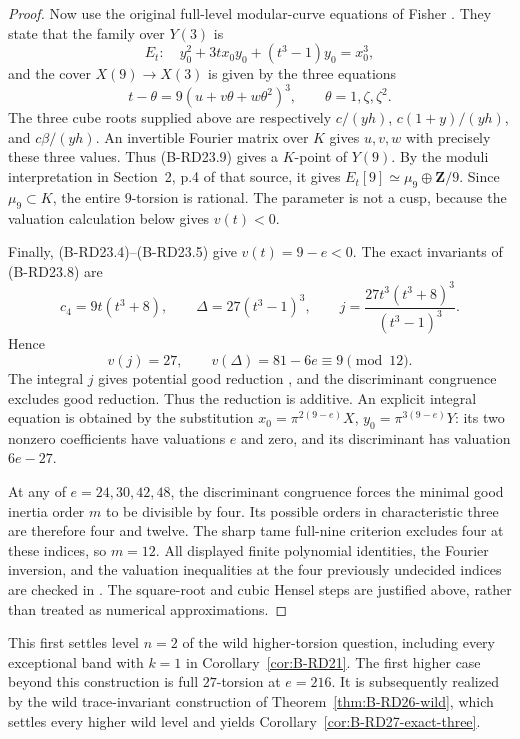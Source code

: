 \begin{proof}
Now use the original full-level modular-curve equations of
Fisher \cite[Lemma~4.2(i), p.8; Theorem~4.3, equation~(9), p.9]
{Fisher2015Nine}. They state that the family over $Y(3)$ is
\[
             E_t:\quad y_0^2+3tx_0y_0+(t^3-1)y_0=x_0^3,
                                                        \tag{B-RD23.8}
\]
and the cover $X(9)\to X(3)$ is given by the three equations
\[
     t-\theta=9(u+v\theta+w\theta^2)^3,
                     \qquad \theta=1,\zeta,\zeta^2.    \tag{B-RD23.9}
\]
The three cube roots supplied above are respectively
$c/(yh)$, $c(1+y)/(yh)$, and $c\beta/(yh)$. An invertible Fourier
matrix over $K$ gives $u,v,w$ with precisely these three values.
Thus (B-RD23.9) gives a $K$-point of $Y(9)$. By the moduli
interpretation in Section~2, p.4 of that source, it gives
$E_t[9]\simeq\mu_9\oplus\mathbf Z/9$. Since $\mu_9\subset K$,
the entire $9$-torsion is rational. The parameter is not a cusp,
because the valuation calculation below gives $v(t)<0$.

Finally, (B-RD23.4)--(B-RD23.5) give $v(t)=9-e<0$. The exact
invariants of (B-RD23.8) are
\[
 c_4=9t(t^3+8),\qquad \Delta=27(t^3-1)^3,\qquad
 j=\frac{27t^3(t^3+8)^3}{(t^3-1)^3}.
\]
Hence
\[
                   v(j)=27,\qquad v(\Delta)=81-6e
                                             \equiv9\pmod {12}.
\]
The integral $j$ gives potential good reduction
\cite[Section~2, p.496]{SerreTate1968Good}, and the discriminant
congruence excludes good reduction. Thus the reduction is additive.
An explicit integral equation is obtained by the substitution
$x_0=\pi^{2(9-e)}X$, $y_0=\pi^{3(9-e)}Y$: its two nonzero
coefficients have valuations $e$ and zero, and its discriminant
has valuation $6e-27$.

At any of $e=24,30,42,48$, the discriminant congruence forces the
minimal good inertia order $m$ to be divisible by four. Its possible
orders in characteristic three are therefore four and twelve.
The sharp tame full-nine criterion excludes four at these indices,
so $m=12$. All displayed finite polynomial identities, the Fourier
inversion, and the valuation inequalities at the four previously
undecided indices are checked in
. The square-root and cubic
Hensel steps are justified above, rather than treated as numerical
approximations.
\end{proof}

\begin{remark}\label{auto:B:b02333f8ed15}

This first settles level $n=2$ of the wild higher-torsion question,
including every exceptional band with $k=1$ in Corollary~\ref{cor:B-RD21}.
The first higher case beyond this construction is full $27$-torsion
at $e=216$. It is subsequently realized by the wild trace-invariant
construction of Theorem~\ref{thm:B-RD26-wild}, which settles every
higher wild level and yields Corollary~\ref{cor:B-RD27-exact-three}.
\end{remark}


